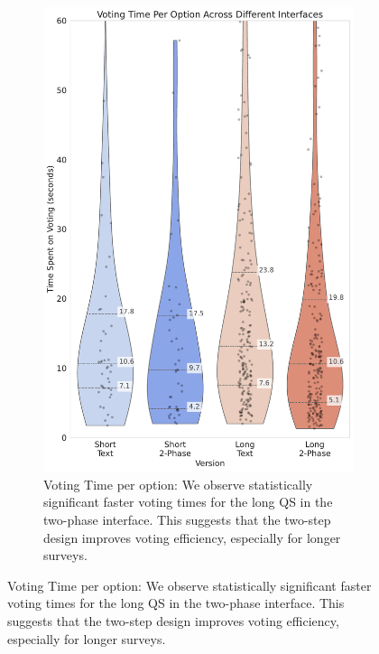 \begin{figure}[htbp]
{\begin{minipage}{0.7\pdfpageheight}
\begin{subfigure}[b]{0.24\pdfpageheight}
                \includegraphics[width=\textwidth]{content/image/results/voting_time_per_option.pdf}
                \captionsetup{width=0.87\textwidth}
                \caption{Voting Time per option: We observe statistically significant faster voting times for the long QS in the two-phase interface. This suggests that the two-step design improves voting efficiency, especially for longer surveys.\vspace{1em}}
                \label{fig:vote_time}
            \end{subfigure}
        \end{minipage}
    }
\end{figure}
